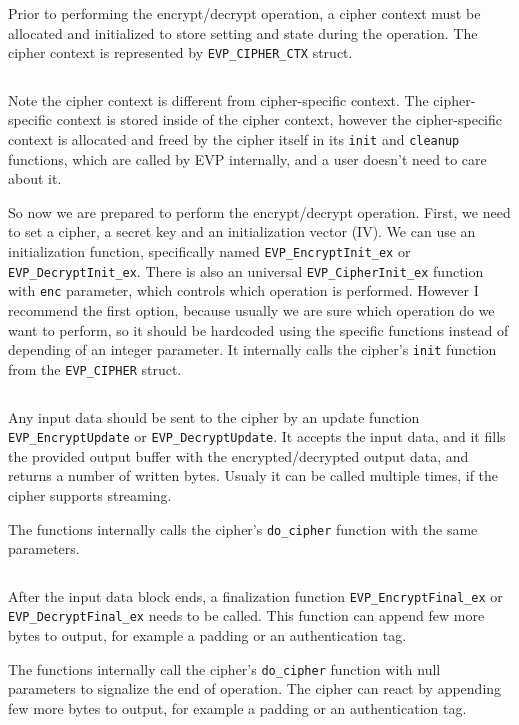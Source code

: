 Prior to performing the encrypt/decrypt operation, a cipher context must be allocated and initialized to store setting and state during the operation. The cipher context is represented by \texttt{EVP\_CIPHER\_CTX} struct.

\inputminted{c}{code/openssl-evp-cipher-ctx-new.c}

Note the cipher context is different from cipher-specific context. The cipher-specific context is stored inside of the cipher context, however the cipher-specific context is allocated and freed by the cipher itself in its \texttt{init} and \texttt{cleanup} functions, which are called by EVP internally, and a user doesn't need to care about it.

So now we are prepared to perform the encrypt/decrypt operation. First, we need to set a cipher, a secret key and an initialization vector (IV). We can use an initialization function, specifically named \texttt{EVP\_EncryptInit\_ex} or \texttt{EVP\_DecryptInit\_ex}. There is also an universal \texttt{EVP\_CipherInit\_ex} function with \texttt{enc} parameter, which controls which operation is performed. However I recommend the first option, because usually we are sure which operation do we want to perform, so it should be hardcoded using the specific functions instead of depending of an integer parameter. It internally calls the cipher's \texttt{init} function from the \texttt{EVP\_CIPHER} struct.

\inputminted{c}{code/openssl-evp-cipherinit.c}

Any input data should be sent to the cipher by an update function \texttt{EVP\_EncryptUpdate} or \texttt{EVP\_DecryptUpdate}. It accepts the input data, and it fills the provided output buffer with the encrypted/decrypted output data, and returns a number of written bytes. Usualy it can be called multiple times, if the cipher supports streaming.

The functions internally calls the cipher's \texttt{do\_cipher} function with the same parameters.

\inputminted{c}{code/openssl-evp-cipherupdate.c}

After the input data block ends, a finalization function \texttt{EVP\_EncryptFinal\_ex} or \texttt{EVP\_DecryptFinal\_ex} needs to be called. This function can append few more bytes to output, for example a padding or an authentication tag.

The functions internally call the cipher's \texttt{do\_cipher} function with null parameters to signalize the end of operation. The cipher can react by appending few more bytes to output, for example a padding or an authentication tag.

